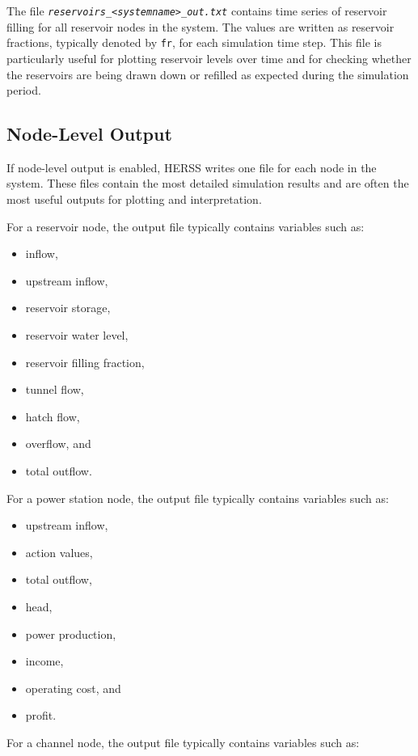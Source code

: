 \documentclass[a4paper, 12pt]{report}
\newcommand{\file}[1]{\textit{\texttt{#1}}}  %
\begin{document}
	The file \file{reservoirs\_<systemname>\_out.txt} contains time series of reservoir filling for all reservoir nodes in the system. The values are written as reservoir fractions, typically denoted by \texttt{fr}, for each simulation time step. This file is particularly useful for plotting reservoir levels over time and for checking whether the reservoirs are being drawn down or refilled as expected during the simulation period.

	\subsection{Node-Level Output}

	If node-level output is enabled, HERSS writes one file for each node in the system. These files contain the most detailed simulation results and are often the most useful outputs for plotting and interpretation.

	For a reservoir node, the output file typically contains variables such as:

	\begin{itemize}
		\item inflow,
		\item upstream inflow,
		\item reservoir storage,
		\item reservoir water level,
		\item reservoir filling fraction,
		\item tunnel flow,
		\item hatch flow,
		\item overflow, and
		\item total outflow.
	\end{itemize}

	For a power station node, the output file typically contains variables such as:

	\begin{itemize}
		\item upstream inflow,
		\item action values,
		\item total outflow,
		\item head,
		\item power production,
		\item income,
		\item operating cost, and
		\item profit.
	\end{itemize}

	For a channel node, the output file typically contains variables such as:
\end{document}
